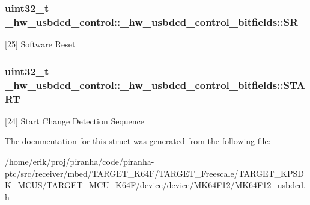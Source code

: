 \subsubsection[{\texorpdfstring{SR}{SR}}]{\setlength{\rightskip}{0pt plus 5cm}uint32\+\_\+t \+\_\+hw\+\_\+usbdcd\+\_\+control\+::\+\_\+hw\+\_\+usbdcd\+\_\+control\+\_\+bitfields\+::\+SR}\hypertarget{struct__hw__usbdcd__control_1_1__hw__usbdcd__control__bitfields_ac59080f548948ce636e9335ae7a8eac9}{}\label{struct__hw__usbdcd__control_1_1__hw__usbdcd__control__bitfields_ac59080f548948ce636e9335ae7a8eac9}
\mbox{[}25\mbox{]} Software Reset 
\subsubsection[{\texorpdfstring{S\+T\+A\+RT}{START}}]{\setlength{\rightskip}{0pt plus 5cm}uint32\+\_\+t \+\_\+hw\+\_\+usbdcd\+\_\+control\+::\+\_\+hw\+\_\+usbdcd\+\_\+control\+\_\+bitfields\+::\+S\+T\+A\+RT}\hypertarget{struct__hw__usbdcd__control_1_1__hw__usbdcd__control__bitfields_a9e0837167f3b525df33837daab7668c4}{}\label{struct__hw__usbdcd__control_1_1__hw__usbdcd__control__bitfields_a9e0837167f3b525df33837daab7668c4}
\mbox{[}24\mbox{]} Start Change Detection Sequence 

The documentation for this struct was generated from the following file\+:\begin{DoxyCompactItemize}
\item 
/home/erik/proj/piranha/code/piranha-\/ptc/src/receiver/mbed/\+T\+A\+R\+G\+E\+T\+\_\+\+K64\+F/\+T\+A\+R\+G\+E\+T\+\_\+\+Freescale/\+T\+A\+R\+G\+E\+T\+\_\+\+K\+P\+S\+D\+K\+\_\+\+M\+C\+U\+S/\+T\+A\+R\+G\+E\+T\+\_\+\+M\+C\+U\+\_\+\+K64\+F/device/device/\+M\+K64\+F12/M\+K64\+F12\+\_\+usbdcd.\+h\end{DoxyCompactItemize}
